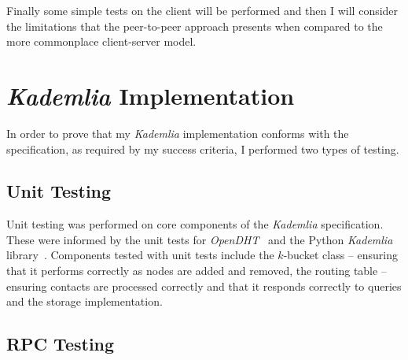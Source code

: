 \documentclass[10pt,twoside,notitlepage,a4paper]{report}
\newcommand{\kademlia}{\emph{Kademlia}}
\newcommand{\K}{$k$}
\begin{document}
	Finally some simple tests on the client will be performed and then I will consider the limitations that the peer-to-peer approach presents when compared to the more commonplace client-server model.
	
	\section{\kademlia{} Implementation}
	In order to prove that my \kademlia{} implementation conforms with the specification, as required by my success criteria, I performed two types of testing.
	
	\subsection{Unit Testing}
	Unit testing was performed on core components of the \kademlia{} specification. These were informed by the unit tests for \emph{OpenDHT}~\cite{opendht} and the Python \kademlia{} library~\cite{pykademlia}. Components tested with unit tests include the \K-bucket class -- ensuring that it performs correctly as nodes are added and removed, the routing table -- ensuring contacts are processed correctly and that it responds correctly to queries and the storage implementation.
	
	\subsection{RPC Testing}
\end{document}
